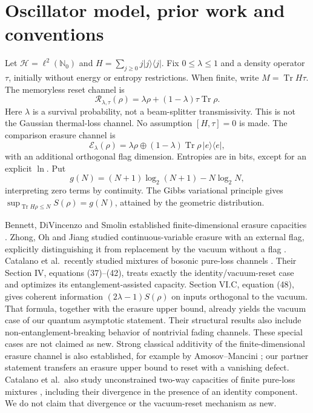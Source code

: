 \documentclass[11pt]{article}
\newcommand{\Tr}{\operatorname{Tr}}
\newcommand{\Rcal}{\mathcal R_{\lambda,\tau}}
\newcommand{\Ecal}{\mathcal E_\lambda}
\begin{document}
\section{Oscillator model, prior work and conventions}
Let $\mathcal H=\ell^2(\mathbb N_0)$ and
$H=\sum_{j\ge0}j|j\rangle\langle j|$. Fix $0\le\lambda\le1$ and a density
operator $\tau$, initially without energy or entropy restrictions.
When finite, write $M=\Tr H\tau$. The memoryless reset channel is
\begin{equation}\label{eq:reset}
 \Rcal(\rho)=\lambda\rho+(1-\lambda)\tau\Tr\rho.
\end{equation}
Here $\lambda$ is a survival probability, not a beam-splitter transmissivity.
This is not the Gaussian thermal-loss channel. No assumption $[H,\tau]=0$
is made. The comparison erasure channel is
\[
 \Ecal(\rho)=\lambda\rho\oplus(1-\lambda)\Tr\rho\,|e\rangle\langle e|,
\]
with an additional orthogonal flag dimension.
Entropies are in bits, except for an explicit $\ln$. Put
\[
 g(N)=(N+1)\log_2(N+1)-N\log_2N,
\]
interpreting zero terms by continuity. The Gibbs variational principle gives
$\sup_{\Tr H\rho\le N}S(\rho)=g(N)$, attained by the geometric distribution.

Bennett, DiVincenzo and Smolin established finite-dimensional erasure
capacities \cite{bds}. Zhong, Oh and Jiang studied continuous-variable
erasure with an external flag, explicitly distinguishing it from
replacement by the vacuum without a flag \cite{zoj}.
Catalano et al.\ recently studied mixtures of bosonic pure-loss channels
\cite{catalano}. Their Section IV, equations (37)--(42), treats exactly
the identity/vacuum-reset case and optimizes its entanglement-assisted
capacity. Section VI.C, equation (48), gives coherent information
$(2\lambda-1)S(\rho)$ on inputs orthogonal to the vacuum.
That formula, together with the erasure upper bound, already yields
the vacuum case of our quantum asymptotic statement.
Their structural results also include non-entanglement-breaking behavior
of nontrivial fading channels. These special cases are not claimed as new.
Strong classical additivity of the finite-dimensional erasure channel
is also established, for example by Amosov--Mancini
\cite[Theorem 9]{amosov}; our partner statement transfers an erasure
upper bound to reset with a vanishing defect.
Catalano et al.\ also study unconstrained two-way capacities of finite
pure-loss mixtures \cite[Section III.D, Theorem 1]{catalano}, including
their divergence in the presence of an identity component.
We do not claim that divergence or the vacuum-reset mechanism as new.
\end{document}
